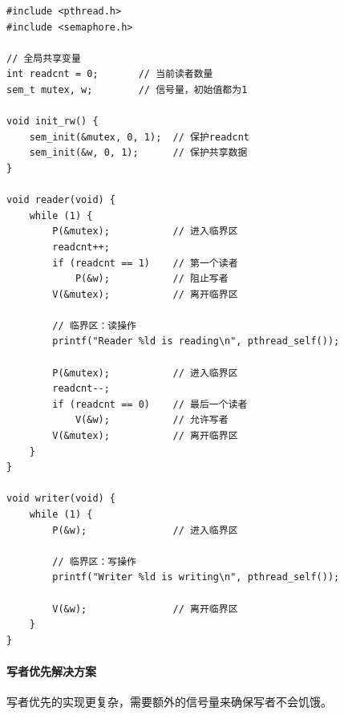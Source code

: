 \begin{lstlisting}[style=CStyle]
#include <pthread.h>
#include <semaphore.h>

// 全局共享变量
int readcnt = 0;       // 当前读者数量
sem_t mutex, w;        // 信号量，初始值都为1

void init_rw() {
    sem_init(&mutex, 0, 1);  // 保护readcnt
    sem_init(&w, 0, 1);      // 保护共享数据
}

void reader(void) {
    while (1) {
        P(&mutex);           // 进入临界区
        readcnt++;
        if (readcnt == 1)    // 第一个读者
            P(&w);           // 阻止写者
        V(&mutex);           // 离开临界区
        
        // 临界区：读操作
        printf("Reader %ld is reading\n", pthread_self());
        
        P(&mutex);           // 进入临界区
        readcnt--;
        if (readcnt == 0)    // 最后一个读者
            V(&w);           // 允许写者
        V(&mutex);           // 离开临界区
    }
}

void writer(void) {
    while (1) {
        P(&w);               // 进入临界区
        
        // 临界区：写操作
        printf("Writer %ld is writing\n", pthread_self());
        
        V(&w);               // 离开临界区
    }
}
\end{lstlisting}

\paragraph{写者优先解决方案}

写者优先的实现更复杂，需要额外的信号量来确保写者不会饥饿。

